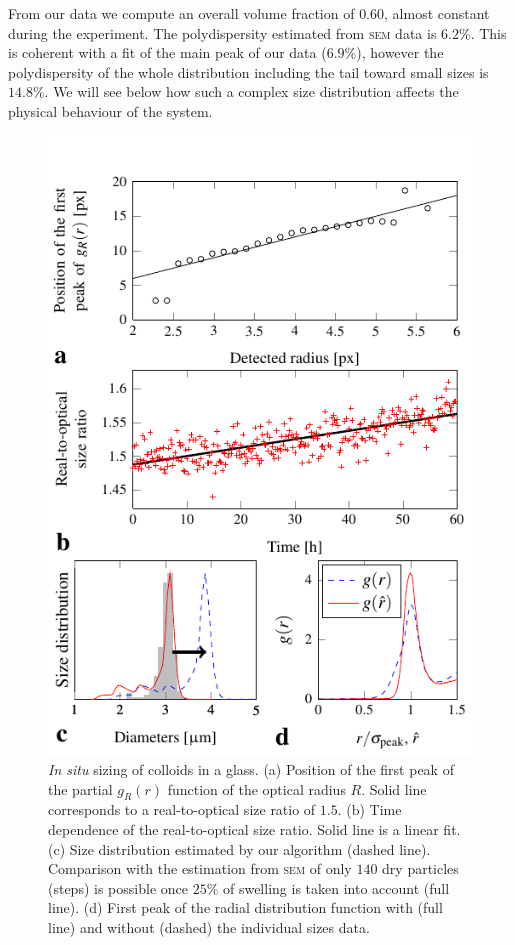 \documentclass[8.5pt,twoside,twocolumn]{article}
\begin{document}
From our data we compute an overall volume fraction of $0.60$, almost constant during the experiment. The polydispersity estimated from \textsc{sem} data is $6.2\%$. This is coherent with a fit of the main peak of our data ($6.9\%$), however the polydispersity of the whole distribution including the tail toward small sizes is $14.8\%$. We will see below how such a complex size distribution affects the physical behaviour of the system.

\begin{figure}[h]
\centering
\includegraphics{fig_sizing.pdf}
	\caption{\emph{In situ} sizing of colloids in a glass. (a) Position of the first peak of the partial $g_R(r)$ function of the optical radius $R$. Solid line corresponds to a real-to-optical size ratio of $1.5$. (b) Time dependence of the real-to-optical size ratio. Solid line is a linear fit. (c) Size distribution estimated by our algorithm (dashed line). Comparison with the estimation from \textsc{sem} of only $140$ dry particles (steps) is possible once $25\%$ of swelling is taken into account (full line). (d) First peak of the radial distribution function with (full line) and without (dashed) the individual sizes data.}
	\label{fig:sizing}
\end{figure}
\end{document}
